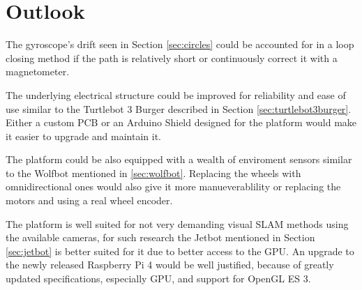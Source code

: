 \documentclass[class=report, crop=false]{standalone}
\begin{document}
\chapter{Outlook}\label{cha:outlook}

The gyroscope's drift seen in Section \ref{sec:circles} could be accounted for in a loop closing method if the path is relatively short or continuously correct it with a magnetometer.

The underlying electrical structure could be improved for reliability and ease of use similar to the Turtlebot 3 Burger described in Section \ref{sec:turtlebot3burger}. Either a custom PCB or an Arduino Shield designed for the platform would make it easier to upgrade and maintain it.

The platform could be also equipped with a wealth of enviroment sensors similar to the Wolfbot mentioned in \ref{sec:wolfbot}. Replacing the wheels with omnidirectional ones would also give it more manueverablility or replacing the motors and using a real wheel encoder.

The platform is well suited for not very demanding visual SLAM methods using the available cameras, for such research the Jetbot mentioned in Section \ref{sec:jetbot} is better suited for it due to better access to the GPU. An upgrade to the newly released Raspberry Pi 4 would be well justified, because of greatly updated specifications, especially GPU, and support for OpenGL ES 3\footnotemark.

\end{document}
